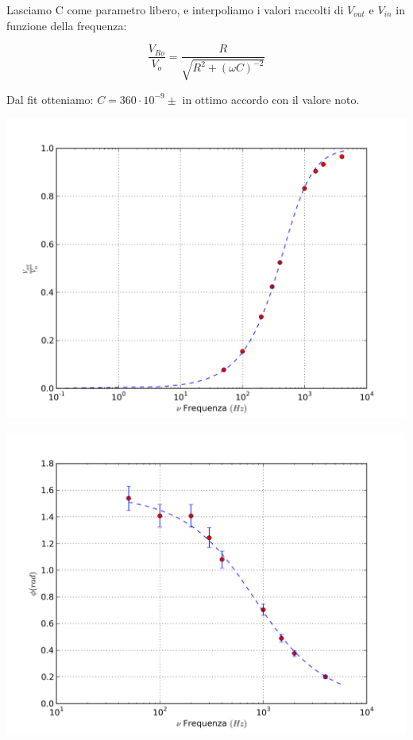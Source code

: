 Lasciamo C come parametro libero, e interpoliamo i valori raccolti di $V_{out}$ e $V_{in}$ in funzione della frequenza:

$$\frac{V_{Ro}}{V_o} = \frac{R}{\sqrt{R^2+(\omega C)^{-2}}}$$

Dal fit otteniamo: $C=360 \cdot 10^{-9} \pm  $ in ottimo accordo con il valore noto.

\begin{center}
 \includegraphics[scale=0.70]{grafici/C3/ddpcond.png}
\end{center}

\begin{center}
 \includegraphics[scale=0.70]{grafici/C3/fasecap.png}
\end{center}


